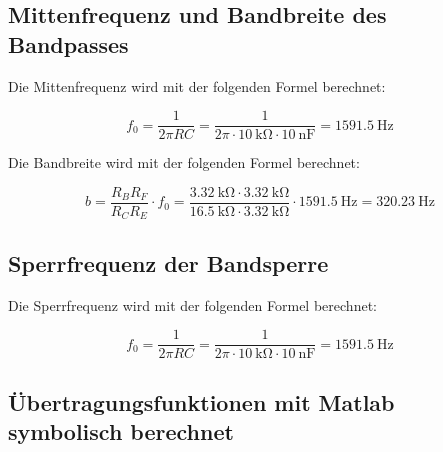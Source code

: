 %

\subsection{Mittenfrequenz und Bandbreite des Bandpasses }

Die Mittenfrequenz wird mit der folgenden Formel berechnet:

\[ f_0 = \frac{1}{2\pi R C} = \frac{1}{2\pi \cdot \SI{10}{\kilo\ohm} \cdot \SI{10}{\nano\farad}} = \SI{1591,5}{\hertz} \]




\newpage

Die Bandbreite wird mit der folgenden Formel berechnet:

\[ b = \frac{R_B R_F}{R_C R_E} \cdot f_0 = \frac{\SI{3.32}{\kilo\ohm} \cdot  \SI{3.32}{\kilo\ohm}}{\SI{16,5}{\kilo\ohm} \cdot \SI{3.32}{\kilo\ohm}} \cdot \SI{1591,5}{\hertz} = \SI{320,23}{\hertz} \]


\subsection{Sperrfrequenz der Bandsperre }

Die Sperrfrequenz wird mit der folgenden Formel berechnet:

\[ f_0 = \frac{1}{2\pi R C} = \frac{1}{2\pi \cdot \SI{10}{\kilo\ohm} \cdot \SI{10}{\nano\farad}} = \SI{1591,5}{\hertz} \]

\subsection{Übertragungsfunktionen mit Matlab symbolisch berechnet}

